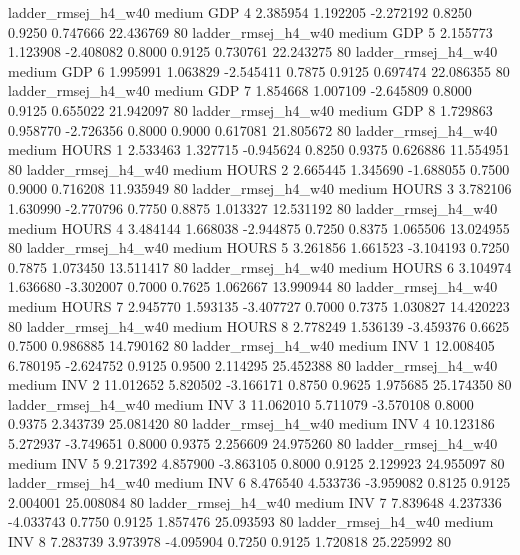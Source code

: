    ladder_rmsej_h4_w40     medium      GDP                 4  2.385954 1.192205 -2.272192 0.8250 0.9250  0.747666   22.436769 80
   ladder_rmsej_h4_w40     medium      GDP                 5  2.155773 1.123908 -2.408082 0.8000 0.9125  0.730761   22.243275 80
   ladder_rmsej_h4_w40     medium      GDP                 6  1.995991 1.063829 -2.545411 0.7875 0.9125  0.697474   22.086355 80
   ladder_rmsej_h4_w40     medium      GDP                 7  1.854668 1.007109 -2.645809 0.8000 0.9125  0.655022   21.942097 80
   ladder_rmsej_h4_w40     medium      GDP                 8  1.729863 0.958770 -2.726356 0.8000 0.9000  0.617081   21.805672 80
   ladder_rmsej_h4_w40     medium    HOURS                 1  2.533463 1.327715 -0.945624 0.8250 0.9375  0.626886   11.554951 80
   ladder_rmsej_h4_w40     medium    HOURS                 2  2.665445 1.345690 -1.688055 0.7500 0.9000  0.716208   11.935949 80
   ladder_rmsej_h4_w40     medium    HOURS                 3  3.782106 1.630990 -2.770796 0.7750 0.8875  1.013327   12.531192 80
   ladder_rmsej_h4_w40     medium    HOURS                 4  3.484144 1.668038 -2.944875 0.7250 0.8375  1.065506   13.024955 80
   ladder_rmsej_h4_w40     medium    HOURS                 5  3.261856 1.661523 -3.104193 0.7250 0.7875  1.073450   13.511417 80
   ladder_rmsej_h4_w40     medium    HOURS                 6  3.104974 1.636680 -3.302007 0.7000 0.7625  1.062667   13.990944 80
   ladder_rmsej_h4_w40     medium    HOURS                 7  2.945770 1.593135 -3.407727 0.7000 0.7375  1.030827   14.420223 80
   ladder_rmsej_h4_w40     medium    HOURS                 8  2.778249 1.536139 -3.459376 0.6625 0.7500  0.986885   14.790162 80
   ladder_rmsej_h4_w40     medium      INV                 1 12.008405 6.780195 -2.624752 0.9125 0.9500  2.114295   25.452388 80
   ladder_rmsej_h4_w40     medium      INV                 2 11.012652 5.820502 -3.166171 0.8750 0.9625  1.975685   25.174350 80
   ladder_rmsej_h4_w40     medium      INV                 3 11.062010 5.711079 -3.570108 0.8000 0.9375  2.343739   25.081420 80
   ladder_rmsej_h4_w40     medium      INV                 4 10.123186 5.272937 -3.749651 0.8000 0.9375  2.256609   24.975260 80
   ladder_rmsej_h4_w40     medium      INV                 5  9.217392 4.857900 -3.863105 0.8000 0.9125  2.129923   24.955097 80
   ladder_rmsej_h4_w40     medium      INV                 6  8.476540 4.533736 -3.959082 0.8125 0.9125  2.004001   25.008084 80
   ladder_rmsej_h4_w40     medium      INV                 7  7.839648 4.237336 -4.033743 0.7750 0.9125  1.857476   25.093593 80
   ladder_rmsej_h4_w40     medium      INV                 8  7.283739 3.973978 -4.095904 0.7250 0.9125  1.720818   25.225992 80
